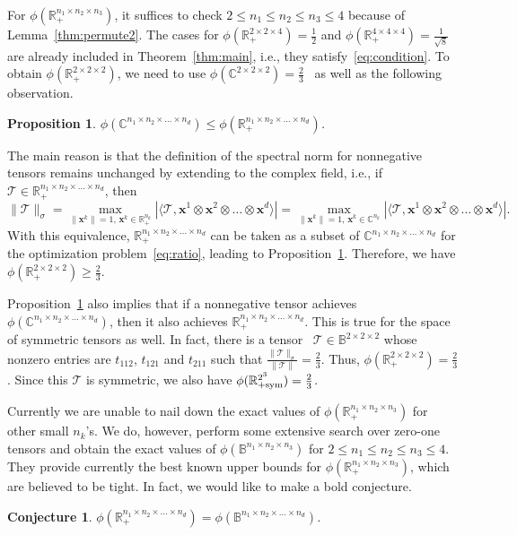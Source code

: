 \documentclass[11pt]{article}
\newtheorem{conjecture}[theorem]{Conjecture}
\newtheorem{proposition}[theorem]{Proposition}
\newcommand{\BB}{\mathbb{B}}
\newcommand{\C}{\mathbb{C}}
\newcommand{\R}{\mathbb{R}}
\newcommand{\TT}{\mathcal{T}}
\newcommand{\bx}{\boldsymbol{x}}
\newcommand{\sym}{\textnormal{sym}}
\begin{document}
For $\phi(\R^{n_1\times n_2\times n_3}_+)$, it suffices to check $2\le n_1\le n_2\le n_3\le 4$ because of Lemma~\ref{thm:permute2}. The cases for $\phi(\R^{2\times 2\times 4}_+)=\frac{1}{2}$ and $\phi(\R^{4\times 4\times 4}_+)=\frac{1}{\sqrt{8}}$ are already included in Theorem~\ref{thm:main}, i.e., they satisfy~\eqref{eq:condition}. To obtain $\phi(\R^{2\times 2\times 2}_+)$, we need to use  $\phi(\C^{2\times 2\times 2})=\frac{2}{3}$~\cite{CKP00} as well as the following observation.
\begin{proposition} \label{thm:c+}
$\phi(\C^{n_1\times n_2\times \dots \times n_d})\le \phi(\R^{n_1\times n_2\times \dots \times n_d}_+)$.
\end{proposition}
The main reason is that the definition of the spectral norm for nonnegative tensors remains unchanged by extending to the complex field, i.e., if $\TT\in\R^{n_1\times n_2\times \dots \times n_d}_+$, then
$$
\|\TT\|_\sigma =\max_{\|\bx^k\|=1,\,\bx^k\in\R^{n_k}_+} |\langle \TT, \bx^1\otimes\bx^2\otimes \dots\otimes \bx^d \rangle|  =\max_{\|\bx^k\|=1,\,\bx^k\in\C^{n_k}}|\langle \TT, \bx^1\otimes\bx^2\otimes \dots\otimes \bx^d\rangle|.
$$
With this equivalence, $\R^{n_1\times n_2\times \dots \times n_d}_+$ can be taken as a subset of $\C^{n_1\times n_2\times \dots \times n_d}$ for the optimization problem~\eqref{eq:ratio}, leading to Proposition~\ref{thm:c+}. Therefore, we have $\phi(\R^{2\times 2\times 2}_+)\ge\frac{2}{3}$.

Proposition~\ref{thm:c+} also implies that if a nonnegative tensor achieves $\phi(\C^{n_1\times n_2\times \dots \times n_d})$, then it also achieves $\R^{n_1\times n_2\times \dots \times n_d}_+$. This is true for the space of symmetric tensors as well. In fact, there is a tensor~\cite[Example 5.2]{LZ20} $\TT\in\BB^{2\times 2\times 2}$ whose nonzero entries are $t_{112}$, $t_{121}$ and $t_{211}$ such that $\frac{\|\TT\|_\sigma}{\|\TT\|}=\frac{2}{3}$. Thus, $\phi(\R^{2\times 2\times 2}_+)=\frac{2}{3}$. Since this $\TT$ is symmetric, we also have $\phi(\R^{2^3}_{+\sym})=\frac{2}{3}$.

Currently we are unable to nail down the exact values of $\phi(\R^{n_1\times n_2\times n_3}_+)$ for other small $n_k$'s. We do, however, perform some extensive search over zero-one tensors and obtain the exact values of $\phi(\BB^{n_1\times n_2\times n_3})$ for $2\le n_1\le n_2\le n_3\le 4$. They provide currently the best known upper bounds for $\phi(\R^{n_1\times n_2\times n_3}_+)$, which are believed to be tight. In fact, we would like to make a bold conjecture.
\begin{conjecture}
$\phi(\R^{n_1\times n_2\times \dots \times n_d}_+)= \phi(\BB^{n_1\times n_2\times \dots \times n_d})$.
\end{conjecture}
\end{document}
